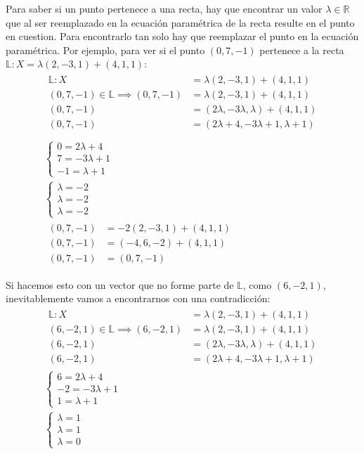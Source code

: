 \documentclass[../teoria.root.tex]{subfiles}
\begin{document}
Para saber si un punto pertenece a una recta, hay que encontrar un valor
$\lambda\in\mathbb{R}$ que al ser reemplazado en la ecuación paramétrica de la
recta resulte en el punto en cuestion. Para encontrarlo tan solo hay que
reemplazar el punto en la ecuación paramétrica. Por ejemplo, para ver si el
punto $(0,7,-1)$ pertenece a la recta $\mathbb{L}:X=\lambda(2,-3,1)+(4,1,1)$:
\begin{gather*}
	\begin{split}
		\mathbb{L}:X&=\lambda(2,-3,1)+(4,1,1)\\
		(0,7,-1)\in\mathbb{L}\implies(0,7,-1)&=\lambda(2,-3,1)+(4,1,1)\\
		(0,7,-1)&=(2\lambda,-3\lambda,\lambda)+(4,1,1)\\
		(0,7,-1)&=(2\lambda+4,-3\lambda+1,\lambda+1)\\
	\end{split}\\
	\begin{cases}
		0=2\lambda+4\\
		7=-3\lambda+1\\
		-1=\lambda+1
	\end{cases}\\
	\begin{cases}
		\lambda=-2\\
		\lambda=-2\\
		\lambda=-2
	\end{cases}\\
	\begin{split}
		(0,7,-1)&=-2(2,-3,1)+(4,1,1)\\
		(0,7,-1)&=(-4,6,-2)+(4,1,1)\\
		(0,7,-1)&=(0,7,-1)
	\end{split}
\end{gather*}

Si hacemos esto con un vector que no forme parte de $\mathbb{L}$, como
$(6,-2,1)$, inevitablemente vamos a encontrarnos con una contradicción:
\begin{gather*}
	\begin{split}
		\mathbb{L}:X&=\lambda(2,-3,1)+(4,1,1)\\
		(6,-2,1)\in\mathbb{L}\implies(6,-2,1)&=\lambda(2,-3,1)+(4,1,1)\\
		(6,-2,1)&=(2\lambda,-3\lambda,\lambda)+(4,1,1)\\
		(6,-2,1)&=(2\lambda+4,-3\lambda+1,\lambda+1)
	\end{split}\\
	\begin{cases}
		6=2\lambda+4\\
		-2=-3\lambda+1\\
		1=\lambda+1
	\end{cases}\\
	\begin{cases}
		\lambda=1\\
		\lambda=1\\
		\lambda=0
	\end{cases}
\end{gather*}
\end{document}
